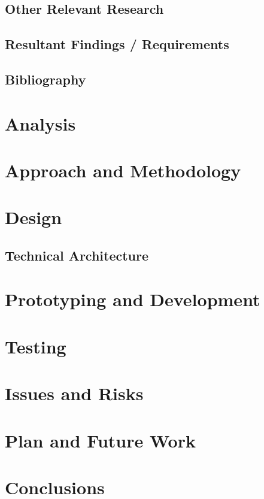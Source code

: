 \documentclass[a4paper, 12pt]{article}
\begin{document}
\subsection{Other Relevant Research}
\subsection{Resultant Findings / Requirements}
\subsection{Bibliography}
\section{Analysis}
\section{Approach and Methodology}
\section{Design}
\subsection{Technical Architecture}
\section{Prototyping and Development}
\section{Testing}
\section{Issues and Risks}
\section{Plan and Future Work}
\section{Conclusions}
\end{document}
